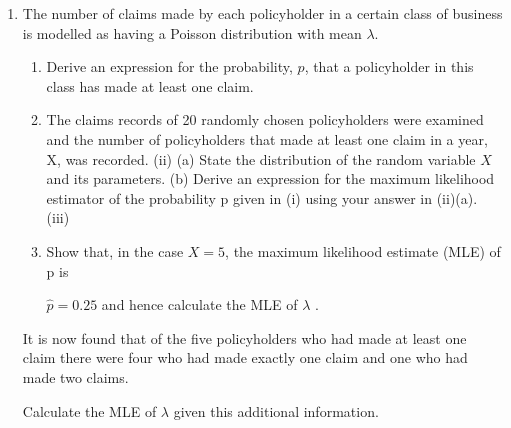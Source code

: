 \documentclass[a4paper,12pt]{article}
\begin{document}
\begin{enumerate}
\item
The number of claims made by each policyholder in a certain class of business is modelled as having a Poisson distribution with mean $\lambda$.

\begin{enumerate}
\item Derive an expression for the probability, $p$, that a policyholder in this class has made at least one claim.
\item The claims records of 20 randomly chosen policyholders were examined and the number of policyholders that made at least one claim in a year, X, was recorded.
(ii)
(a) State the distribution of the random variable $X$ and its parameters.
(b) Derive an expression for the maximum likelihood estimator of the
probability p given in (i) using your answer in (ii)(a).
(iii)
\item Show that, in the case $X = 5$, the maximum likelihood estimate (MLE) of p is

$\hat{p} = 0.25$ and hence calculate the MLE of $\lambda$ .
\end{enumerate}
It is now found that of the five policyholders who had made at least one claim there were four who had made exactly one claim and one who had made two claims.

Calculate the MLE of $\lambda$ given this additional information.
\end{enumerate}

\newpage
\end{document}
